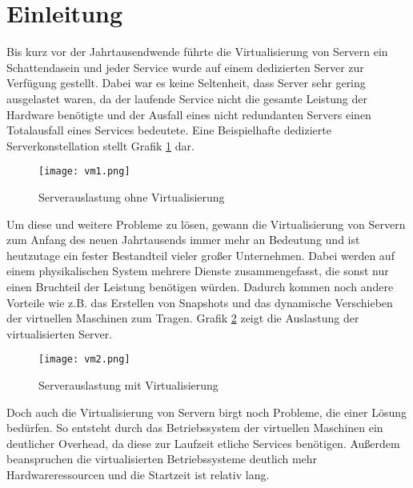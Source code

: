 \section{Einleitung}
\label{sec:Einleitung}
Bis kurz vor der Jahrtausendwende führte die Virtualisierung von Servern ein Schattendasein und jeder Service wurde auf einem dedizierten Server zur Verfügung gestellt.
Dabei war es keine Seltenheit, dass Server sehr gering ausgelastet waren, da der laufende Service nicht die gesamte Leistung der Hardware benötigte und der Ausfall eines nicht redundanten Servers einen Totalausfall eines Services bedeutete.
Eine Beispielhafte dedizierte Serverkonstellation stellt Grafik \ref{fig:HW1} dar.
\begin{figure}[H]
	\begin{center}
		\texttt{[image: vm1.png]}
	\end{center}
	\caption[Serverauslastung ohne Virtualisierung]{Serverauslastung ohne Virtualisierung \footnotemark}
	\label{fig:HW1}
\end{figure}
\newpage
Um diese und weitere Probleme zu lösen, gewann die Virtualisierung von Servern zum Anfang des neuen Jahrtausends immer mehr an Bedeutung und ist heutzutage ein fester Bestandteil vieler großer Unternehmen.
Dabei werden auf einem physikalischen System mehrere Dienste zusammengefasst, die sonst nur einen Bruchteil der Leistung benötigen würden.
Dadurch kommen noch andere Vorteile wie z.B. das Erstellen von Snapshots und das dynamische Verschieben der virtuellen Maschinen zum Tragen.
Grafik \ref{fig:HW2} zeigt die Auslastung der virtualisierten Server.
\begin{figure}[H]
	\begin{center}
		\texttt{[image: vm2.png]}
	\end{center}
	\caption[Serverauslastung mit Virtualisierung]{Serverauslastung mit Virtualisierung \footnotemark}
	\label{fig:HW2}
\end{figure}
\newpage
Doch auch die Virtualisierung von Servern birgt noch Probleme, die einer Lösung bedürfen.
So entsteht durch das Betriebssystem der virtuellen Maschinen ein deutlicher Overhead, da diese zur Laufzeit etliche Services benötigen.
Außerdem beanspruchen die virtualisierten Betriebssysteme deutlich mehr Hardwareressourcen und die Startzeit ist relativ lang.

